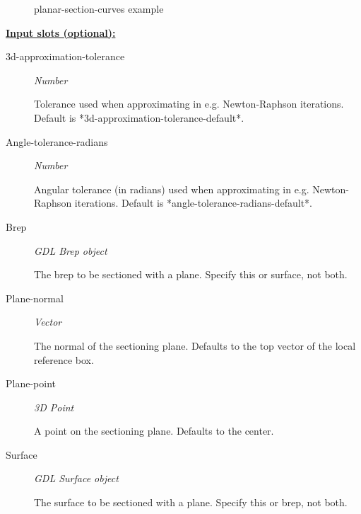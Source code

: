 \documentclass [11pt]{book}
\begin{document}
\begin{itemize}
\begin{figure}
\caption{planar-section-curves example}

\label{fig:planar-section-curves}

\end{figure}





\textbf{
\underline{Input slots (optional):}}

\begin{description}

\item [3d-approximation-tolerance]
\emph{Number}

 Tolerance used when approximating in e.g. Newton-Raphson iterations.
Default is *3d-approximation-tolerance-default*.




\item [Angle-tolerance-radians]
\emph{Number}

 Angular tolerance (in radians) used when approximating in e.g. Newton-Raphson iterations.
Default is *angle-tolerance-radians-default*.




\item [Brep]
\emph{GDL Brep object}

 The brep to be sectioned with a plane. Specify this or surface, not both.




\item [Plane-normal]
\emph{Vector}

 The normal of the sectioning plane. Defaults to the top vector of the local reference box.




\item [Plane-point]
\emph{3D Point}

 A point on the sectioning plane. Defaults to the center.




\item [Surface]
\emph{GDL Surface object}

 The surface to be sectioned with a plane. Specify this or brep, not both.




\end{description}







\end{itemize}
\end{document}
